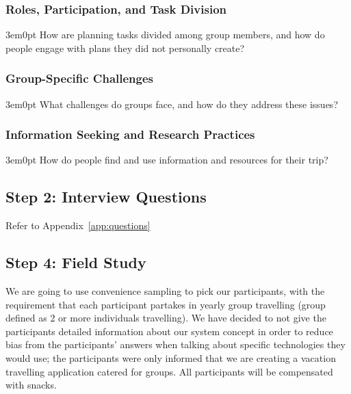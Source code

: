 \documentclass[12pt,a4paper]{article}
\begin{document}
\subsubsection{Roles, Participation, and Task Division}

\begin{adjustwidth}{3em}{0pt}
How are planning tasks divided among group members, and how do people engage with plans they did not personally create?
\end{adjustwidth}

\subsubsection{Group-Specific Challenges}

\begin{adjustwidth}{3em}{0pt}
What challenges do groups face, and how do they address these issues?
\end{adjustwidth}

\subsubsection{Information Seeking and Research Practices}

\begin{adjustwidth}{3em}{0pt}
How do people find and use information and resources for their trip?
\end{adjustwidth}


\subsection{Step 2: Interview Questions }
Refer to Appendix~\ref{app:questions}



\subsection{Step 4: Field Study}
\par
\indent
We are going to use convenience sampling to pick our participants, with the requirement that each participant partakes in yearly group travelling (group defined as 2 or more individuals travelling). We have decided to not give the participants detailed information about our system concept in order to reduce bias from the participants’ answers when talking about specific technologies they would use; the participants were only informed that we are creating a vacation travelling application catered for groups. All participants will be compensated with snacks.
\\
\end{document}
